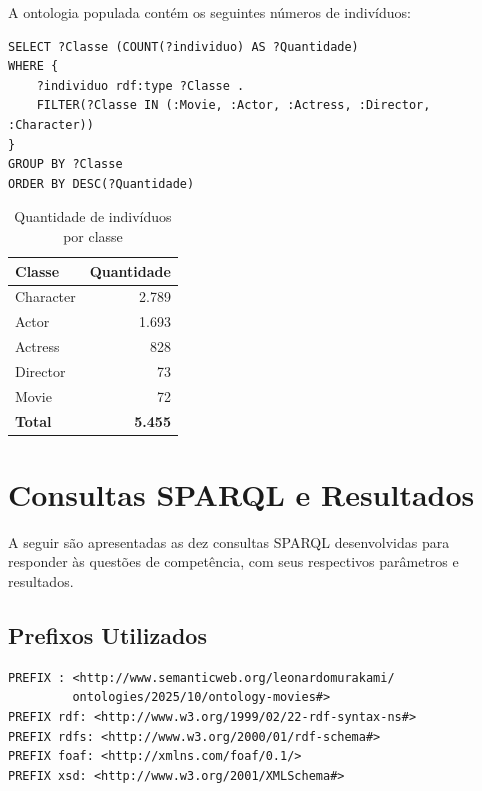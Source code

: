 \documentclass[12pt,a4paper]{article}
\begin{document}
A ontologia populada contém os seguintes números de indivíduos:

\begin{lstlisting}
SELECT ?Classe (COUNT(?individuo) AS ?Quantidade)
WHERE {
    ?individuo rdf:type ?Classe .
    FILTER(?Classe IN (:Movie, :Actor, :Actress, :Director, :Character))
}
GROUP BY ?Classe
ORDER BY DESC(?Quantidade)
\end{lstlisting}

\begin{table}[H]
\centering
\caption{Quantidade de indivíduos por classe}
\begin{tabular}{|l|r|}
\hline
\textbf{Classe} & \textbf{Quantidade} \\
\hline
Character & 2.789 \\
\hline
Actor & 1.693 \\
\hline
Actress & 828 \\
\hline
Director & 73 \\
\hline
Movie & 72 \\
\hline
\textbf{Total} & \textbf{5.455} \\
\hline
\end{tabular}
\end{table}

\newpage
\section{Consultas SPARQL e Resultados}

A seguir são apresentadas as dez consultas SPARQL desenvolvidas para responder às questões de competência, com seus respectivos parâmetros e resultados.

\subsection{Prefixos Utilizados}

\begin{lstlisting}
PREFIX : <http://www.semanticweb.org/leonardomurakami/
         ontologies/2025/10/ontology-movies#>
PREFIX rdf: <http://www.w3.org/1999/02/22-rdf-syntax-ns#>
PREFIX rdfs: <http://www.w3.org/2000/01/rdf-schema#>
PREFIX foaf: <http://xmlns.com/foaf/0.1/>
PREFIX xsd: <http://www.w3.org/2001/XMLSchema#>
\end{lstlisting}


\end{document}
